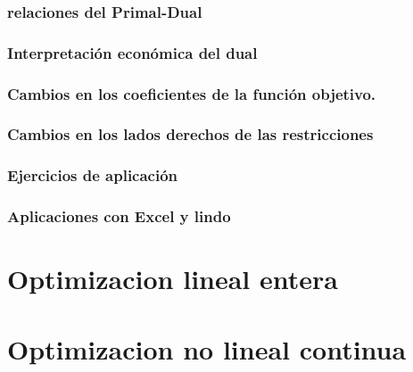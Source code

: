 \documentclass[
  letterpaper,
  DIV=11,
  numbers=noendperiod]{scrreprt}
\theoremstyle{definition}
\theoremstyle{definition}
\theoremstyle{remark}
\begin{document}
\hypertarget{relaciones-del-primal-dual}{%
\subsection{relaciones del
Primal-Dual}\label{relaciones-del-primal-dual}}

\hypertarget{interpretaciuxf3n-econuxf3mica-del-dual}{%
\subsection{Interpretación económica del
dual}\label{interpretaciuxf3n-econuxf3mica-del-dual}}

\hypertarget{cambios-en-los-coeficientes-de-la-funciuxf3n-objetivo.}{%
\subsection{Cambios en los coeficientes de la función
objetivo.}\label{cambios-en-los-coeficientes-de-la-funciuxf3n-objetivo.}}

\hypertarget{cambios-en-los-lados-derechos-de-las-restricciones}{%
\subsection{Cambios en los lados derechos de las
restricciones}\label{cambios-en-los-lados-derechos-de-las-restricciones}}

\hypertarget{ejercicios-de-aplicaciuxf3n-1}{%
\subsection{Ejercicios de
aplicación}\label{ejercicios-de-aplicaciuxf3n-1}}

\hypertarget{aplicaciones-con-excel-y-lindo-1}{%
\subsection{Aplicaciones con Excel y
lindo}\label{aplicaciones-con-excel-y-lindo-1}}

\hypertarget{optimizacion-lineal-entera}{%
\chapter{Optimizacion lineal entera}\label{optimizacion-lineal-entera}}

\hypertarget{optimizacion-no-lineal-continua}{%
\chapter{Optimizacion no lineal
continua}\label{optimizacion-no-lineal-continua}}
\end{document}
